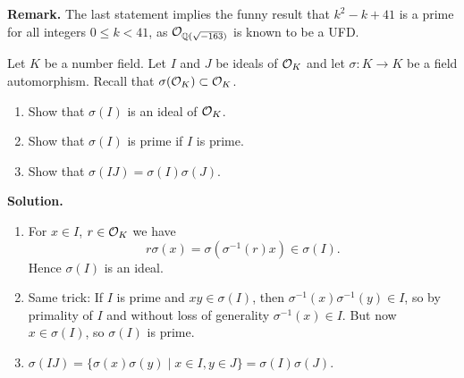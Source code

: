 \documentclass[a4paper,11pt]{article}
\begin{document}
\textbf{Remark.} The last statement implies the funny result that $k^2 - k + 41$
is a prime for all integers $0 \leq k < 41$, as $\mathcal{O}_{\mathbb{Q}(\sqrt{-163})}$ is known 
to be a UFD.


Let $K$ be a number field. Let $I$ and $J$ be ideals of 
$\mathcal{O}_K$ and let $\sigma: K \to K$ be a field automorphism. Recall that 
$\sigma(\mathcal{O}_K) \subset \mathcal{O}_K$.
\begin{enumerate}
    \item Show that $\sigma(I)$ is an ideal of $\mathcal{O}_K$.
    \item Show that $\sigma(I)$ is prime if $I$ is prime.
    \item Show that $\sigma(IJ) = \sigma(I)\sigma(J)$.
\end{enumerate}
\textbf{Solution.}
\begin{enumerate}[labelindent=0pt, wide]
    \item For $x \in I$, $r \in \mathcal{O}_K$ we have 
        $$r\sigma(x) = \sigma (\sigma^{-1}(r) x) \in \sigma(I).$$
        Hence $\sigma(I)$ is an ideal.
    \item Same trick: If $I$ is prime and $xy \in \sigma(I)$, then 
        $\sigma^{-1}(x) \sigma^{-1}(y) \in I$, so by primality of $I$ 
        and without loss of generality $\sigma^{-1}(x) \in I.$ But now 
        $x \in \sigma(I)$, so $\sigma(I)$ is prime. 
    \item $\sigma(IJ) = \{\sigma(x)\sigma(y) \mid x \in I, y \in J\} =
        \sigma(I) \sigma(J).$
\end{enumerate}
\end{document}
